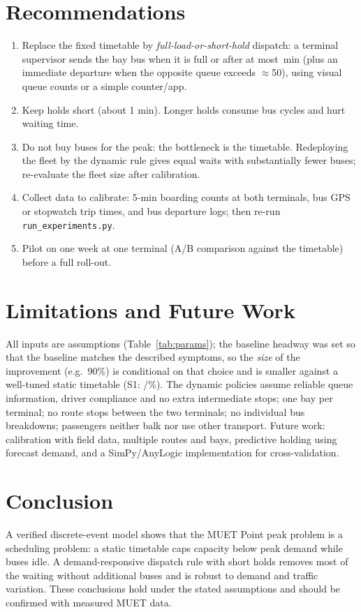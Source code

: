 \documentclass[10pt,twocolumn,letterpaper]{article}
\begin{document}
\section{Recommendations}
\begin{enumerate}
\item Replace the fixed timetable by \emph{full-load-or-short-hold} dispatch: a terminal supervisor sends the bay bus when it is full or after at most \fourHold\,min (plus an
immediate departure when the opposite queue exceeds $\approx$50), using visual queue counts or a simple counter/app.
\item Keep holds short (about 1 min). Longer holds consume bus cycles and hurt waiting time.
\item Do not buy buses for the peak: the bottleneck is the timetable. Redeploying the fleet by the dynamic rule gives equal waits with substantially fewer buses; re-evaluate the fleet size
after calibration.
\item Collect data to calibrate: 5-min boarding counts at both terminals, bus GPS or stopwatch trip times, and bus departure logs; then re-run \texttt{run\_experiments.py}.
\item Pilot on one week at one terminal (A/B comparison against the timetable) before a full roll-out.
\end{enumerate}

\section{Limitations and Future Work}
All inputs are assumptions (Table~\ref{tab:params}); the baseline headway was set so that the baseline matches the described symptoms, so the \emph{size} of the improvement
(e.g.\ 90\%) is conditional on that choice and is smaller against a well-tuned static timetable (S1: \SOnemorRed/\SOneaftRed\%). The dynamic policies assume reliable queue
information, driver compliance and no extra intermediate stops; one bay per terminal; no route stops between the two terminals; no individual bus breakdowns; passengers
neither balk nor use other transport. Future work: calibration with field data, multiple routes and bays, predictive holding using forecast demand, and a SimPy/AnyLogic
implementation for cross-validation.

\section{Conclusion}
A verified discrete-event model shows that the MUET Point peak problem is a scheduling problem: a static timetable caps capacity below peak demand while buses idle. A
demand-responsive dispatch rule with short holds removes most of the waiting without additional buses and is robust to demand and traffic variation. These conclusions hold under the stated
assumptions and should be confirmed with measured MUET data.
\end{document}
